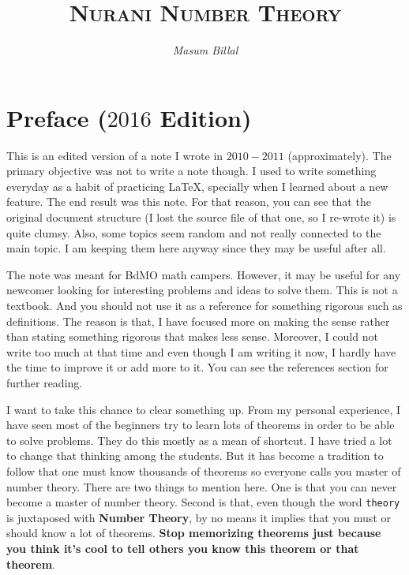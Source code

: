 \documentclass[a4paper, leqno]{article}
\author{\itshape Masum Billal}
\title{\scshape Nurani Number Theory}
\theoremstyle{definition}
\theoremstyle{remark}
\begin{document}
	\maketitle
	\titlepage
	\section*{Preface ($2016$ Edition)}
		This is an edited version of a note I wrote in $2010-2011$ (approximately). The primary objective was not to write a note though. I used to write something everyday as a habit of practicing \LaTeX, specially when I learned about a new feature. The end result was this note. For that reason, you can see that the original document structure (I lost the source file of that one, so I re-wrote it) is quite clumsy. Also, some topics seem random and not really connected to the main topic. I am keeping them here anyway since they may be useful after all.
		
		The note was meant for BdMO math campers. However, it may be useful for any newcomer looking for interesting problems and ideas to solve them. This is not a textbook. And you should not use it as a reference for something rigorous such as definitions. The reason is that, I have focused more on making the sense rather than stating something rigorous that makes less sense. Moreover, I could not write too much at that time and even though I am writing it now, I hardly have the time to improve it or add more to it. You can see the references section for further reading.
		
		I want to take this chance to clear something up. From my personal experience, I have seen most of the beginners try to learn lots of theorems in order to be able to solve problems. They do this mostly as a mean of shortcut. I have tried a lot to change that thinking among the students. But it has become a tradition to follow that one must know thousands of theorems so everyone calls you master of number theory. There are two things to mention here. One is that you can never become a master of number theory. Second is that, even though the word \texttt{theory} is juxtaposed with \textbf{Number Theory}, by no means it implies that you must or should know a lot of theorems. \textbf{Stop memorizing theorems just because you think it's cool to tell others you know this theorem or that theorem}.
		
\end{document}
